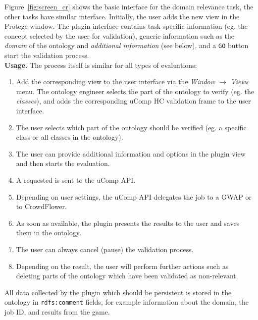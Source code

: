 Figure~\ref{fig:screen_cr} shows the basic interface for the domain relevance task, the other tasks
have similar interface.
Initially, the user adds the new view in the Protege window. The plugin interface contains
task specific information (eg. the concept selected by the user for validation),
generic information such as the \emph{domain} of the ontology and \emph{additional information} (see below),
and a \texttt{GO} button start the validation process. \\


\textbf{Usage.} The process itself is similar for all types of evaluations:
\begin{enumerate}
\item Add the corresponding view to the user interface via the \emph{Window $\rightarrow{}$ Views} menu. The ontology engineer
selects the part of the ontology to verify (eg. the \emph{classes}), and adds the corresponding uComp HC validation frame to the user interface. 
\item The user selects which part of the ontology should be verified (eg. a specific class or all classes in the ontology).
\item The user can provide additional information and options in the plugin view and then starts the evaluation.
\item A requested is sent to the uComp API.
\item Depending on user settings, the uComp API delegates the job to a GWAP or to CrowdFlower.
\item As soon as available, the plugin presents the results to the user and saves them in the ontology.
\item The user can always cancel (pause) the validation process.
\item Depending on the result, the user will perform further actions such as deleting parts of the ontology which have been validated as non-relevant.
\end{enumerate}



All data collected by the plugin which should be persistent is stored in the ontology in \texttt{rdfs:comment} fields,
for example information about the domain, the job ID, and results from the game.



